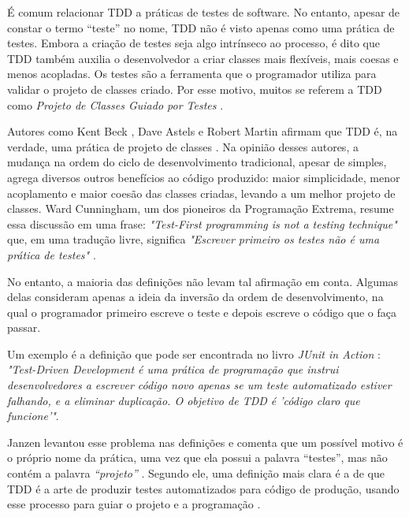 \documentclass[conference]{IEEEtran}
\begin{document}
É comum relacionar TDD a práticas de testes de software. No entanto, apesar de constar o
termo ``teste'' no nome, TDD não é visto apenas como uma prática de testes.
Embora a criação de testes seja algo intrínseco ao processo, é dito que TDD também 
auxilia o desenvolvedor a criar classes mais flexíveis, mais coesas e
menos acopladas. Os testes são a ferramenta que o programador utiliza para
validar o projeto de classes criado. Por esse motivo, muitos se referem a TDD como
\textit{Projeto de Classes Guiado por Testes} \cite{tdd-taxonomy}.

Autores como Kent Beck \cite{aim-fire}, Dave Astels \cite{astels-tdd} e
Robert Martin \cite{bob-martin} afirmam que TDD é, na verdade, uma prática de
projeto de classes \cite{tdd-taxonomy} \cite{aim-fire}.
Na opinião desses autores, a mudança na ordem do ciclo de
desenvolvimento tradicional, apesar de simples, agrega diversos outros
benefícios ao código produzido: maior simplicidade, menor acoplamento e maior
coesão das classes criadas, levando a um melhor projeto de classes. 
Ward Cunningham, um dos pioneiros da Programação Extrema, resume essa 
discussão em uma frase: \textit{"Test-First programming is not a testing technique"} 
que, em uma tradução livre, significa \textit{"Escrever primeiro os testes
não é uma prática de testes"} \cite{aim-fire}.

No entanto, a maioria das definições não levam tal afirmação em conta.
Algumas delas consideram apenas a ideia da
inversão da ordem de desenvolvimento, na qual o programador primeiro
escreve o teste e depois escreve o código que o faça passar.

Um exemplo é a definição que pode ser encontrada no livro \textit{JUnit
in Action} \cite{junit-in-action}: \textit{"Test-Driven Development é uma
prática de programação que instrui desenvolvedores a escrever código novo
apenas se um teste automatizado estiver falhando, e a eliminar duplicação. O
objetivo de TDD é 'código claro que funcione'"}.

Janzen levantou esse problema nas definições e comenta que um possível 
motivo é o próprio nome da prática, uma vez
que ela possui a palavra ``testes'', mas não contém a palavra \textit{``projeto''} 
\cite{tdd-really-improve}.
Segundo ele, uma definição mais clara é a de que TDD é a arte de produzir testes
automatizados para código de produção, usando esse processo para guiar o 
projeto e a programação \cite{agilealliance-tdd} \cite{tdd-taxonomy}.

\end{document}
